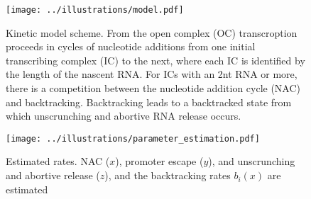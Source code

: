 \begin{figure}
	\begin{center}
        \texttt{[image: ../illustrations/model.pdf]}
	\end{center}
    \caption{Kinetic model scheme. From the open complex (OC)
    transcroption proceeds in cycles of nucleotide additions from one initial
    transcribing complex (IC) to the next, where each IC is identified by the
    length of the nascent RNA. For ICs with an 2nt RNA or more, there is a
    competition between the nucleotide addition cycle (NAC) and backtracking.
    Backtracking leads to a backtracked state from which unscrunching and
    abortive RNA release occurs.}
    \label{fig:model}
\end{figure}

\begin{figure}
	\begin{center}
        \texttt{[image: ../illustrations/parameter\_estimation.pdf]}
	\end{center}
    \caption{Estimated rates. NAC ($x$), promoter escape ($y$), and
    unscrunching and abortive release ($z$), and the backtracking rates
    $b_i(x)$ are estimated}
    \label{fig:parameter_estimation}
\end{figure}
%
